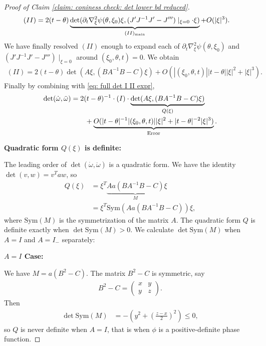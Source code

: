 \documentclass[12pt]{amsart}
\numberwithin{equation}{section}
\newcommand{\1}{\mathbbm{1}}
\newcommand{\sym}{\mathrm{Sym}}
\begin{document}
\begin{proof}[Proof of Claim \ref{claim: coniness check: det lower bd reduced}]
\begin{align}
    (II) &= 2(t - \theta) \underbrace{\det(\partial_t \nabla_\xi^2 \psi(\theta, \xi_0) \xi, (J' J^{-1} J' - J''')\mid_{\xi = 0} \cdot\xi)}_{(II)_{\rm{main}}} + O(|\xi|^3).
\end{align}
We have finally resolved $(II)$ enough to expand each of $\partial_t \nabla_\xi^2 \psi(\theta, \xi_0)$ and $(J'J^{-1} J'-J''')\mid_{\xi = 0}$ around $(\xi_0, \theta,t) = 0$. We obtain 
\begin{align}
    (II) = 2(t - \theta) \det(A \xi, (BA^{-1}B - C) \xi) + O(|(\xi_0, \theta, t)| |t - \theta| |\xi|^2 + |\xi|^3).
\end{align}
Finally by combining with \eqref{eq: full det I II expr}, 
\begin{align}
    \det(\dot \omega, \ddot \omega) &= 2(t - \theta)^{-1} \cdot (I) \cdot \underbrace{\det(A \xi, (B A^{-1} B - C)\xi)}_{Q(\xi)} \\ & \qquad+ \underbrace{O(|t-\theta|^{-1} |(\xi_0, \theta,t)| |\xi|^2 + |t-\theta|^{-2} |\xi|^3)}_{\rm{Error}}.
\end{align}

\noindent \textbf{Quadratic form $Q(\xi)$ is definite:}

The leading order of $\det(\dot \omega, \ddot \omega)$ is a quadratic form. 
We have the identity $\det(v,w) = v^T a w$, so 
\begin{align}
    Q(\xi) &= \xi^T \underbrace{A a(B A^{-1} B -C)}_M \xi \\
    &= \xi^T \sym(Aa(B A^{-1} B - C))\xi,
\end{align}
where $\sym(M)$ is the symmetrization of the matrix $A$. The quadratic form $Q$ is definite exactly when $\det \sym(M) > 0$. We calculate $\det \sym(M)$ when $A = I$ and $A = I_-$ separately: 

\noindent \textbf{$A = I$ Case:}

We have $M = a(B^2 - C)$. The matrix $B^2 - C$ is symmetric, say 
\begin{align}
    B^2 - C = 
    \begin{pmatrix}
        x & y \\
        y & z 
    \end{pmatrix}.
\end{align}
Then
\begin{align}
    \det \sym(M) &= - (y^2 + (\frac{z-x}{2})^2) \leq 0,
\end{align}
so $Q$ is never definite when $A = I$, that is when $\phi$ is a positive-definite phase function. 


\end{proof}
\end{document}
